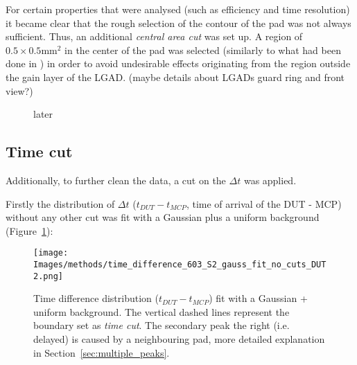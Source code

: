 
For certain properties that were analysed (such as efficiency and time resolution) it became clear that the rough selection of the contour of the pad was not always sufficient. Thus, an additional \textit{central area cut} was set up. A region of \(0.5\times0.5\unit{\milli\meter^2}\) in the center of the pad was selected (similarly to what had been done in \cite{Agapopoulou_2022}) in order to avoid undesirable effects originating from the region outside the gain layer of the LGAD. (maybe details about LGADs guard ring and front view?)

\begin{figure}[h!tbp]
    \centering
    \hfill
    \captionsetup{width=\captionwidth}
    \caption{later}
\end{figure}

\subsection{Time cut}\label{subsec:time_cut}

Additionally, to further clean the data, a cut on the \(\Delta t\) was applied.

Firstly the distribution of \(\Delta t\) (\(t_{DUT}-t_{MCP}\), time of arrival of the DUT - MCP) without any other cut was fit with a Gaussian plus a uniform background (Figure~\ref{fig:time_cut_gauss+bg_fit}):

\begin{figure}[h!tbp]
    \centering
    \texttt{[image: Images/methods/time\_difference\_603\_S2\_gauss\_fit\_no\_cuts\_DUT2.png]}
    \captionsetup{width=\captionwidth}
    \caption{Time difference distribution (\(t_{DUT}-t_{MCP}\)) fit with a Gaussian + uniform background. The vertical dashed lines represent the boundary set as \textit{time cut}. The secondary peak 
     the right (i.e. delayed) is caused by a neighbouring pad, more detailed explanation in Section~\ref{sec:multiple_peaks}.}
    \label{fig:time_cut_gauss+bg_fit}
\end{figure}

